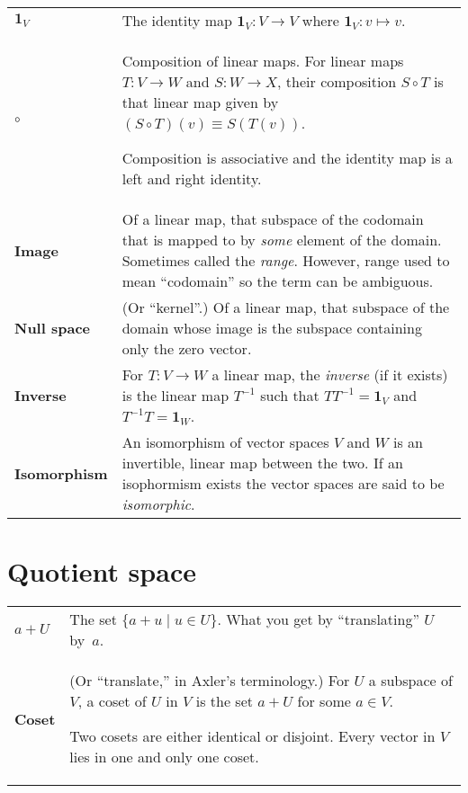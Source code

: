 \documentclass[10pt, a4paper, landscape]{article}
\newcommand{\defn}[1]{\textbf{#1}}
\newcommand{\id}{\mathbold{1}}
\begin{document}
\begin{multicols*}{3}
\begin{tabularx}{\columnwidth}{@{}l>{\raggedright\arraybackslash}X@{}}
  $\id_V$ & The identity map $\id_V\colon V\to V$ where $\id_V\colon v\mapsto v$. \\

  $\circ$ & Composition of linear maps. For linear maps $T\colon V\to W$ and $S\colon W\to X$, their composition $S\circ T$ is that linear map given by $(S\circ T)(v) \equiv S(T(v))$.

  Composition is associative and the identity map is a left and right
  identity. \\

  \defn{Image} & Of a linear map, that subspace of the codomain that is mapped to by \emph{some} element of the domain. Sometimes called the \emph{range}. However, range used to mean “codomain” so the term can be ambiguous. \\

  \defn{Null space} & (Or “kernel”.) Of a linear map, that subspace of the domain whose image is the subspace containing only the zero vector. \\

  \defn{Inverse} & For $T:V\to W$ a linear map, the \emph{inverse} (if it
  exists) is the linear map $T^{-1}$ such that $TT^{-1}=\id_V$ and $T^{-1}T=\id_W$. \\

  \defn{Isomorphism} & An isomorphism of vector spaces $V$ and $W$ is an invertible, linear map between the two. If an isophormism exists the vector spaces are said to be \emph{isomorphic}. 
  
\end{tabularx}


\section*{Quotient space}
\begin{tabularx}{\columnwidth}{@{}l>{\raggedright\arraybackslash}X@{}}
  \toprule
  \defn{$a+U$} & The set $\{a+u\mid u\in U\}$. What you get by “translating” $U$ by~$a$.  \\ 

  \defn{Coset} & (Or “translate,” in Axler's terminology.) For $U$ a
  subspace of $V$, a coset of $U$ in $V$ is the set $a+U$ for some $a\in V$.

  Two cosets are either identical or disjoint. Every vector in $V$ lies
  in one and only one coset.  \\


\end{tabularx}
\end{multicols*}
\end{document}
